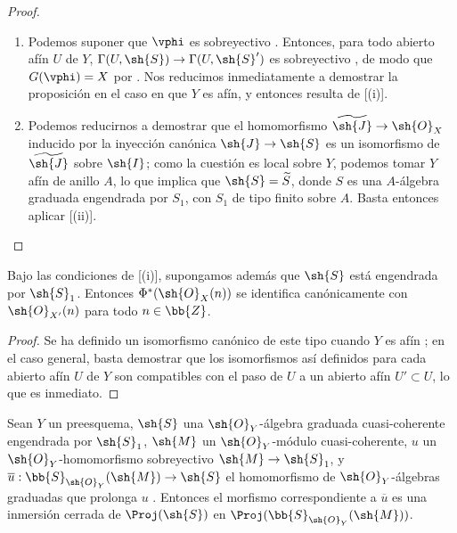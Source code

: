 \documentclass[oneside,10pt]{amsart}
\makeatletter
\newcommand{\ega@arrow}[2]{\mathchoice{#1}{#2}{#2}{#2}}
\renewcommand{\to}{\ega@arrow{\longrightarrow}{\rightarrow}}
\let\EGAOriginalLabel\label
\renewcommand{\label}[1]{\phantomsection\EGAOriginalLabel{#1}}
\makeatother
\begin{document}
\begin{proof}
\medskip\noindent
\begin{enumerate}
  \item[(i)] Podemos suponer que $\vphi$ es sobreyectivo .
    Entonces, para todo abierto afín $U$ de $Y$, $\Gamma(U,\sh{S})\to\Gamma(U,\sh{S}')$ es sobreyectivo , de modo que $G(\vphi)=X$ por .
    Nos reducimos inmediatamente a demostrar la proposición en el caso en que $Y$ es afín, y entonces resulta de [(i)].
  \item[(ii)] Podemos reducirnos a demostrar que el homomorfismo $\widetilde{\sh{J}}\to\sh{O}_X$ inducido por la inyección canónica $\sh{J}\to\sh{S}$ es un isomorfismo de $\widetilde{\sh{J}}$ sobre $\sh{I}$; como la cuestión es local sobre $Y$, podemos tomar $Y$ afín de anillo $A$, lo que implica que $\sh{S}=\widetilde{S}$, donde $S$ es una $A$-álgebra graduada engendrada por $S_1$, con $S_1$ de tipo finito sobre $A$.
    Basta entonces aplicar [(ii)].
\end{enumerate}
\end{proof}

\begin{corollary}[3.6.3]
\label{II.3.6.3}
Bajo las condiciones de [(i)], supongamos además que $\sh{S}$ está engendrada por $\sh{S}_1$.
Entonces $\Phi^*(\sh{O}_X(n))$ se identifica canónicamente con $\sh{O}_{X'}(n)$ para todo $n\in\bb{Z}$.
\end{corollary}

\begin{proof}
Se ha definido un isomorfismo canónico de este tipo cuando $Y$ es afín ; en el caso general, basta demostrar que los isomorfismos así definidos para cada abierto afín $U$ de $Y$ son compatibles con el paso de $U$ a un abierto afín $U'\subset U$, lo que es inmediato.
\end{proof}

\begin{corollary}[3.6.4]
\label{II.3.6.4}
Sean $Y$ un preesquema, $\sh{S}$ una $\sh{O}_Y$-álgebra graduada cuasi-coherente engendrada por $\sh{S}_1$, $\sh{M}$ un $\sh{O}_Y$-módulo cuasi-coherente, $u$ un $\sh{O}_Y$-homomorfismo sobreyectivo $\sh{M}\to\sh{S}_1$, y $\overline{u}:\bb{S}_{\sh{O}_Y}(\sh{M})\to\sh{S}$ el homomorfismo de $\sh{O}_Y$-álgebras graduadas que prolonga $u$ .
Entonces el morfismo correspondiente a $\overline{u}$ es una inmersión cerrada de $\Proj(\sh{S})$ en $\Proj(\bb{S}_{\sh{O}_Y}(\sh{M}))$.
\end{corollary}
\end{document}
